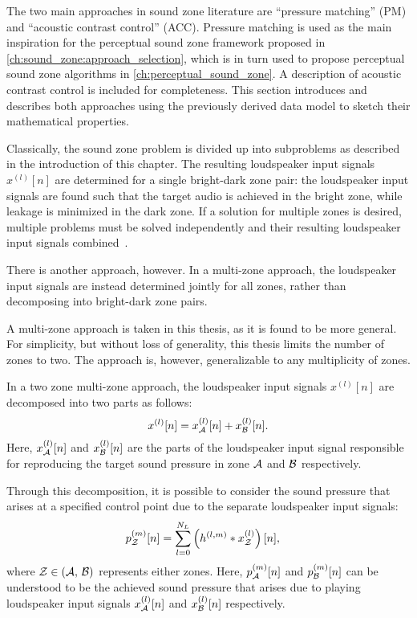 The two main approaches in sound zone literature are ``pressure matching'' (PM) and ``acoustic contrast control'' (ACC).
Pressure matching is used as the main inspiration for the perceptual sound zone framework 
proposed in \autoref{ch:sound_zone:approach_selection}, which is in turn used to propose perceptual sound zone algorithms 
in \autoref{ch:perceptual_sound_zone}.
A description of acoustic contrast control is included for completeness.
This section introduces and describes both approaches using the previously derived data model to sketch their mathematical properties.

Classically, the sound zone problem is divided up into subproblems as described in the introduction of this chapter.
The resulting loudspeaker input signals $x^{(l)}[n]$ are determined for a single bright-dark zone pair:
the loudspeaker input signals are found such that the target audio is achieved in the bright zone, while leakage is minimized in the dark zone.
If a solution for multiple zones is desired, multiple problems must be solved independently and their resulting loudspeaker input signals combined~\cite{betlehem2015personal}.

There is another approach, however.
In a multi-zone approach, the loudspeaker input signals are instead determined jointly for all zones, 
rather than decomposing into bright-dark zone pairs.

A multi-zone approach is taken in this thesis, as it is found to be more general.
For simplicity, but without loss of generality, this thesis limits the number of zones to two.
The approach is, however, generalizable to any multiplicity of zones.

In a two zone multi-zone approach, the loudspeaker input signals $x^{(l)}[n]$ are decomposed into two parts as follows:
\begin{equation}
    x^{(l)}[n] = x_{\mathcal{A}}^{(l)}[n] + x_{\mathcal{B}}^{(l)}[n].
\end{equation}
Here, $x_{\mathcal{A}}^{(l)}[n]$ and $x_{\mathcal{B}}^{(l)}[n]$ are the parts of the loudspeaker input signal responsible for reproducing the target sound pressure 
in zone $\mathcal{A}$ and $\mathcal{B}$ respectively.

Through this decomposition, it is possible to consider the sound pressure that arises at a specified control point due to the separate loudspeaker input signals:
\begin{align}
    p_{\mathcal{Z}}^{(m)}[n] &= \sum_{l=0}^{N_L} \left(h^{(l,m)} \ast x_{\mathcal{Z}}^{(l)}\right)[n],
\end{align}
\label{eq:sound_zone:approaches:pressure}
where $\mathcal{Z} \in \left(\mathcal{A},\,\mathcal{B}\right)$ represents either zones.
Here, $p_{\mathcal{A}}^{(m)}[n]$ and $p_{\mathcal{B}}^{(m)}[n]$ can be understood to be the achieved sound pressure that arises due to 
playing loudspeaker input signals $x_{\mathcal{A}}^{(l)}[n]$ and $x_{\mathcal{B}}^{(l)}[n]$ respectively. 

